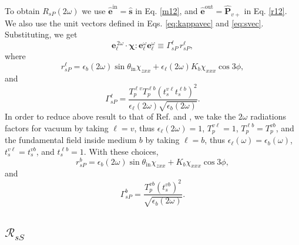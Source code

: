 To obtain $R_{sP}(2\omega)$ we use
$\hat{\mathbf{e}}^{\mathrm{in}}=\hat{\mathbf{s}}$ in Eq. \eqref{m12}, and
$\hat{\mathbf{e}}^{\mathrm{out}}=\hat{\mathbf{P}}_{v+}$ in Eq. \eqref{r12}. We
also use the unit vectors defined in Eqs. \eqref{eq:kappavec} and
\eqref{eq:svec}. Substituting, we get
\begin{equation*}
\mathbf{e}^{\,2\omega}_{\ell}\cdot
\boldsymbol{\chi}:\mathbf{e}^\omega_{\ell}\mathbf{e}^\omega_{\ell}
\equiv\Gamma^{\ell}_{sP}\, r^{\ell}_{sP},
\end{equation*}
where
\begin{equation}
r^{\ell}_{sP}
= \epsilon_{b}(2\omega)\sin\theta_{\mathrm{in}}\chi_{zxx}
+ \epsilon_{\ell}(2\omega)K_{b}\chi_{xxx}\cos3\phi,
\end{equation} 
and  
\begin{equation}
\Gamma^{\ell}_{sP}=
\frac{T_{p}^{\ell v}T^{\ell b}_{p}\left(t_s^{v\ell}t^{\ell b}_s\right)^2}
     {\epsilon_{\ell}(2\omega)\sqrt{\epsilon_{b}(2\omega)}}.  
\end{equation} 
In order to reduce above result to that of Ref. \cite{mizrahiJOSA88} and
\cite{sipePRB87}, we take the $2\omega$ radiations factors for vacuum by
taking $\ell=v$, thus $\epsilon_{\ell}(2\omega)=1$, $T^{v\ell}_{p}=1$,
$T^{\ell b}_{p}=T^{vb}_{p}$, and the fundamental field inside medium $b$ by
taking $\ell=b$, thus $\epsilon_{\ell}(\omega)=\epsilon_{b}(\omega)$,
$t^{v\ell}_s=t^{vb}_s$, and $t^{\ell b}_s=1$. With these choices,
\begin{equation*}
r^{b}_{sP} = \epsilon_{b}(2\omega)\sin\theta_{\mathrm{in}}\chi_{zxx}
+ K_{b}\chi_{xxx}\cos3\phi,
\end{equation*} 
and 
\begin{equation*}
\Gamma^{b}_{sP} =
\frac{T^{v b}_{p}(t_s^{vb})^{2}}{\sqrt{\epsilon_{b}(2\omega)}}.  
\end{equation*}


\subsection{\texorpdfstring{$\mathcal{R}_{sS}$}{RsS}}

